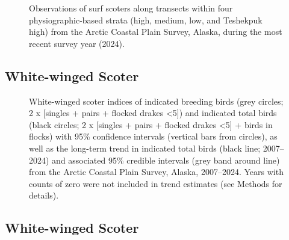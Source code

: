\documentclass[
]{article}
\begin{document}
\begin{figure}


\caption{\label{fig-SUSCmap}Observations of surf scoters along transects
within four physiographic-based strata (high, medium, low, and Teshekpuk
high) from the Arctic Coastal Plain Survey, Alaska, during the most
recent survey year (2024).}

\end{figure}%

\newpage{}

\subsection*{White-winged Scoter}\label{white-winged-scoter}

\begin{figure}


\caption{\label{fig-WWSC}White-winged scoter indices of indicated
breeding birds (grey circles; 2 x {[}singles + pairs + flocked drakes
\textless5{]}) and indicated total birds (black circles; 2 x {[}singles
+ pairs + flocked drakes \textless5{]} + birds in flocks) with 95\%
confidence intervals (vertical bars from circles), as well as the
long-term trend in indicated total birds (black line; 2007--2024) and
associated 95\% credible intervals (grey band around line) from the
Arctic Coastal Plain Survey, Alaska, 2007--2024. Years with counts of
zero were not included in trend estimates (see Methods for details).}

\end{figure}%

\newpage{}

\subsection*{White-winged Scoter}\label{white-winged-scoter-1}

\begingroup\fontsize{10}{12}\selectfont
\end{document}
